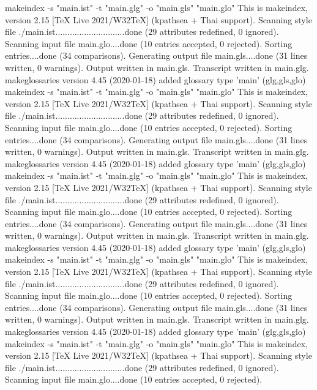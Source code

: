 makeindex  -s "main.ist" -t "main.glg" -o "main.gls" "main.glo"
This is makeindex, version 2.15 [TeX Live 2021/W32TeX] (kpathsea + Thai support).
Scanning style file ./main.ist.............................done (29 attributes redefined, 0 ignored).
Scanning input file main.glo....done (10 entries accepted, 0 rejected).
Sorting entries....done (34 comparisons).
Generating output file main.gls....done (31 lines written, 0 warnings).
Output written in main.gls.
Transcript written in main.glg.
makeglossaries version 4.45 (2020-01-18)
added glossary type 'main' (glg,gls,glo)
makeindex  -s "main.ist" -t "main.glg" -o "main.gls" "main.glo"
This is makeindex, version 2.15 [TeX Live 2021/W32TeX] (kpathsea + Thai support).
Scanning style file ./main.ist.............................done (29 attributes redefined, 0 ignored).
Scanning input file main.glo....done (10 entries accepted, 0 rejected).
Sorting entries....done (34 comparisons).
Generating output file main.gls....done (31 lines written, 0 warnings).
Output written in main.gls.
Transcript written in main.glg.
makeglossaries version 4.45 (2020-01-18)
added glossary type 'main' (glg,gls,glo)
makeindex  -s "main.ist" -t "main.glg" -o "main.gls" "main.glo"
This is makeindex, version 2.15 [TeX Live 2021/W32TeX] (kpathsea + Thai support).
Scanning style file ./main.ist.............................done (29 attributes redefined, 0 ignored).
Scanning input file main.glo....done (10 entries accepted, 0 rejected).
Sorting entries....done (34 comparisons).
Generating output file main.gls....done (31 lines written, 0 warnings).
Output written in main.gls.
Transcript written in main.glg.
makeglossaries version 4.45 (2020-01-18)
added glossary type 'main' (glg,gls,glo)
makeindex  -s "main.ist" -t "main.glg" -o "main.gls" "main.glo"
This is makeindex, version 2.15 [TeX Live 2021/W32TeX] (kpathsea + Thai support).
Scanning style file ./main.ist.............................done (29 attributes redefined, 0 ignored).
Scanning input file main.glo....done (10 entries accepted, 0 rejected).
Sorting entries....done (34 comparisons).
Generating output file main.gls....done (31 lines written, 0 warnings).
Output written in main.gls.
Transcript written in main.glg.
makeglossaries version 4.45 (2020-01-18)
added glossary type 'main' (glg,gls,glo)
makeindex  -s "main.ist" -t "main.glg" -o "main.gls" "main.glo"
This is makeindex, version 2.15 [TeX Live 2021/W32TeX] (kpathsea + Thai support).
Scanning style file ./main.ist.............................done (29 attributes redefined, 0 ignored).
Scanning input file main.glo....done (10 entries accepted, 0 rejected).
